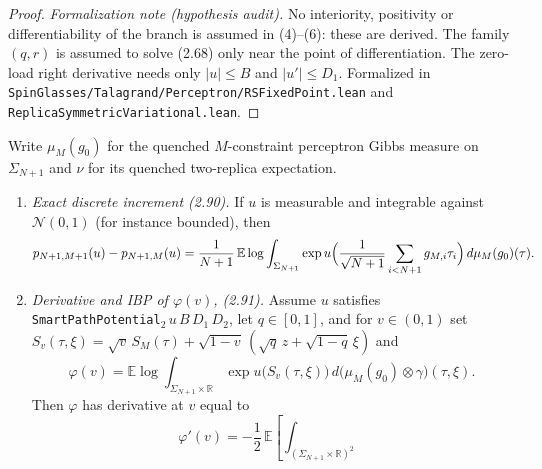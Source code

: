 \begin{proof}
\emph{Formalization note (hypothesis audit).} No interiority, positivity or differentiability of the
branch is assumed in (4)--(6): these are derived. The family $(q,r)$ is assumed to solve (2.68) only near
the point of differentiation. The zero-load right derivative needs only $|u|\le B$ and $|u'|\le D_1$.
Formalized in \texttt{SpinGlasses/Talagrand/Perceptron/RSFixedPoint.lean} and
\texttt{ReplicaSymmetricVariational.lean}.
\end{proof}

\begin{proposition}\label{prop:sg-tal:perceptron-second-proof-increment}
  \leanok
Write $\mu_M(g_0)$ for the quenched $M$-constraint perceptron Gibbs measure on $\Sigma_{N+1}$ and
$\nu$ for its quenched two-replica expectation.
\begin{enumerate}
\item \emph{Exact discrete increment (2.90).} If $u$ is measurable and integrable against $\mathcal N(0,1)$ (for instance bounded), then
\[
 p_{N+1,M+1}(u)-p_{N+1,M}(u)
 =\frac{1}{N+1}\,\mathbb E\log\int_{\Sigma_{N+1}}
   \exp u\Bigl(\frac{1}{\sqrt{N+1}}\sum_{i<N+1}g_{M,i}\tau_i\Bigr)\,d\mu_M(g_0)(\tau).
\]
\item \emph{Derivative and IBP of $\varphi(v)$, (2.91).} Assume $u$ satisfies
\texttt{SmartPathPotential}$_2\,u\,B\,D_1\,D_2$, let $q\in[0,1]$, and for $v\in(0,1)$ set
$S_v(\tau,\xi)=\sqrt v\,S_M(\tau)+\sqrt{1-v}\,(\sqrt q\,z+\sqrt{1-q}\,\xi)$ and
\[
 \varphi(v)=\mathbb E\log\int_{\Sigma_{N+1}\times\mathbb R}\exp u\bigl(S_v(\tau,\xi)\bigr)\,
   d\bigl(\mu_M(g_0)\otimes\gamma\bigr)(\tau,\xi).
\]
Then $\varphi$ has derivative at $v$ equal to
\[
 \varphi'(v)=-\frac{1}{2}\,\mathbb E\!\left[\int_{(\Sigma_{N+1}\times\mathbb R)^2}
\]
\end{enumerate}
\end{proposition}
